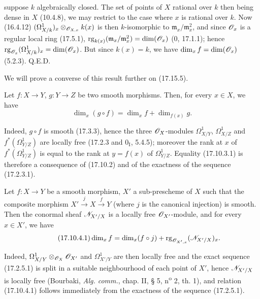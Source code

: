 
suppose $k$ algebraically closed. The set of points of $X$ rational over $k$ then being dense in $X$ (10.4.8), we may restrict to the case where $x$ is rational over $k$. Now (16.4.12) $(\Omega^1_{X/k})_x\otimes_{\mathscr{O}_{X,x}}k(x)$ is then $k$-isomorphic to $\mathfrak m_x/\mathfrak m_x^2$, and since $\mathscr{O}_x$ is a regular local ring (17.5.1), $\operatorname{rg}_{k(x)}(\mathfrak m_x/\mathfrak m_x^2)=\dim(\mathscr{O}_x)$ (0, 17.1.1); hence $\operatorname{rg}_{\mathscr{O}_x}(\Omega^1_{X/k})_x=\dim(\mathscr{O}_x)$. But since $k(x)=k$, we have $\dim_x f=\dim(\mathscr{O}_x)$ (5.2.3). Q.E.D.

We will prove a converse of this result further on (17.15.5).

\begin{corollary}[17.10.3]
\label{IV.17.10.3}
Let $f:X\to Y$, $g:Y\to Z$ be two smooth morphisms. Then, for every $x\in X$, we have
\begin{equation}
\label{IV.17.10.3.1}
\tag{17.10.3.1}
\dim_x(g\circ f)=\dim_x f+\dim_{f(x)}g.
\end{equation}
\end{corollary}

Indeed, $g\circ f$ is smooth (17.3.3), hence the three $\mathscr{O}_X$-modules $\Omega^1_{X/Y}$, $\Omega^1_{X/Z}$ and $f^*(\Omega^1_{Y/Z})$ are locally free (17.2.3 and $0_{\mathrm I}$, 5.4.5); moreover the rank at $x$ of $f^*(\Omega^1_{Y/Z})$ is equal to the rank at $y=f(x)$ of $\Omega^1_{Y/Z}$. Equality (17.10.3.1) is therefore a consequence of (17.10.2) and of the exactness of the sequence (17.2.3.1).

\begin{corollary}[17.10.4]
\label{IV.17.10.4}
Let $f:X\to Y$ be a smooth morphism, $X'$ a sub-prescheme of $X$ such that the composite morphism $X'\xrightarrow{j}X\xrightarrow{f}Y$ (where $j$ is the canonical injection) is smooth. Then the conormal sheaf $\mathscr{N}_{X'/X}$ is a locally free $\mathscr{O}_{X'}$-module, and for every $x\in X'$, we have
\begin{equation}
\label{IV.17.10.4.1}
\tag{17.10.4.1}
\dim_x f=\dim_x(f\circ j)+\operatorname{rg}_{\mathscr{O}_{X',x}}(\mathscr{N}_{X'/X})_x.
\end{equation}
\end{corollary}

Indeed, $\Omega^1_{X/Y}\otimes_{\mathscr{O}_X}\mathscr{O}_{X'}$ and $\Omega^1_{X'/Y}$ are then locally free and the exact sequence (17.2.5.1) is split in a suitable neighbourhood of each point of $X'$, hence $\mathscr{N}_{X'/X}$ is locally free (Bourbaki, \emph{Alg. comm.}, chap. II, § 5, n\textsuperscript{o} 2, th. 1), and relation (17.10.4.1) follows immediately from the exactness of the sequence (17.2.5.1).

